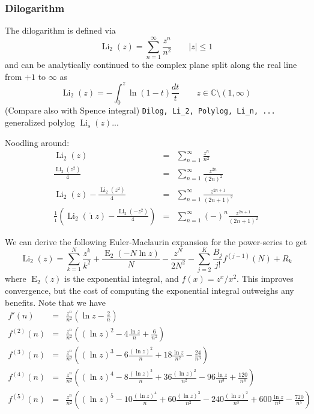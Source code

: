 \documentclass[10pt,dvipdfmx,letterpaper,twoside]{article}
\let\O=\operatorname
\newcommand{\CC}{{\mathbb{C}}}
\newcommand{\ii}{{\hat{\imath}}}
\begin{document}
\subsubsection{Dilogarithm}
The dilogarithm is defined via
\[ \O{Li}_2(z) = \sum_{n=1}^\infty \frac{z^n}{n^2} \qquad |z|\leq1 \]
and can be analytically continued to the complex plane split along the real line from $+1$ to $\infty$ as
\[ \O{Li}_2(z) = -\int_0^z \ln(1-t) \frac{dt}{t} \qquad z\in\CC\setminus(1,\infty) \]
(Compare also with Spence integral)
{\tt Dilog, Li\_2, Polylog, Li\_n, ...} generalized polylog $\O{Li}_s(z)$...

Noodling around:
\begin{eqnarray*}
\O{Li}_2(z) &=& \sum_{n=1}^\infty \frac{z^n}{n^2} \\
\frac{\O{Li}_2(z^2)}{4} &=& \sum_{n=1}^\infty \frac{z^{2n}}{(2n)^2} \\
\O{Li}_2(z) - \frac{\O{Li}_2(z^2)}{4} &=& \sum_{n=1}^\infty \frac{z^{2n+1}}{(2n+1)^2} \\
\frac{1}{\ii}\left(\O{Li}_2(\ii z) - \frac{\O{Li}_2(-z^2)}{4}\right) &=& \sum_{n=1}^\infty (-)^n \frac{z^{2n+1}}{(2n+1)^2}
\end{eqnarray*}

We can derive the following Euler-Maclaurin expansion for the power-series to get
\[ \O{Li}_2(z) = \sum_{k=1}^N\frac{z^k}{k^2} + \frac{\O{E}_2(-N\ln z)}{N} - \frac{z^N}{2 N^2} - \sum_{j=2}^K \frac{B_j}{j!}f^{(j-1)}(N) + R_k \]
where $\O{E}_2(z)$ is the exponential integral, and $f(x) = z^x/x^2$.  This improves convergence, but the cost of computing the exponential integral
outweighs any benefits.
Note that we have
\begin{eqnarray*}
f'(n) &=& \frac{z^n}{n^2}\left( \ln z - \frac{2}{n} \right) \\
f^{(2)}(n) &=& \frac{z^n}{n^2}\left( (\ln z)^2 - 4\frac{\ln z}{n} + \frac{6}{n^2} \right) \\
f^{(3)}(n) &=& \frac{z^n}{n^2}\left( (\ln z)^3 - 6\frac{(\ln z)^2}{n} + 18\frac{\ln z}{n^2} - \frac{24}{n^3} \right) \\
f^{(4)}(n) &=& \frac{z^n}{n^2}\left( (\ln z)^4 - 8\frac{(\ln z)^3}{n} + 36\frac{(\ln z)^2}{n^2}
    - 96\frac{\ln z}{n^3} + \frac{120}{n^4} \right) \\
f^{(5)}(n) &=& \frac{z^n}{n^2}\left( (\ln z)^5 - 10\frac{(\ln z)^4}{n} + 60\frac{(\ln z)^3}{n^2}
    - 240\frac{(\ln z)^2}{n^3} + 600\frac{\ln z}{n^4} - \frac{720}{n^5} \right)
\end{eqnarray*}
\end{document}

